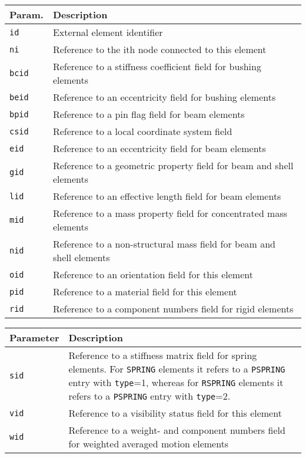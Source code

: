 \noindent
\begin{tabular}{| m{} | m{} |}
  \hline
  \rowcolor[HTML]{EFEFEF}
  Param. & Description  \\
  \hline\hline
  {\tt id} & External element identifier \\
  \hline
  {\tt ni} & Reference to the ith node connected to this element \\
  \hline
  {\tt bcid} & Reference to a stiffness coefficient field for bushing elements \\
  \hline
  {\tt beid} & Reference to an eccentricity field for bushing elements \\
  \hline
  {\tt bpid} & Reference to a pin flag field for beam elements \\
  \hline
  {\tt csid} & Reference to a local coordinate system field \\
  \hline
  {\tt eid} & Reference to an eccentricity field for beam elements \\
  \hline
  {\tt gid} & Reference to a geometric property field for beam and shell elements \\
  \hline
  {\tt lid} & Reference to an effective length field for beam elements \\
  \hline
  {\tt mid} & Reference to a mass property field for concentrated mass elements \\
  \hline
  {\tt nid} & Reference to a non-structural mass field for beam and shell elements \\
  \hline
  {\tt oid} & Reference to an orientation field for this element \\
  \hline
  {\tt pid} & Reference to a material field for this element \\
  \hline
  {\tt rid} & Reference to a component numbers field for rigid elements \\
  \hline
\end{tabular}

\noindent
\begin{tabular}{| m{} | m{} |}
  \hline
  \rowcolor[HTML]{EFEFEF}
  Parameter & Description  \\
  \hline\hline
  {\tt sid} & Reference to a stiffness matrix field for spring elements.\newline
              For {\tt SPRING} elements it refers to a {\tt PSPRING}
              entry with {\tt type}=1,
              whereas for {\tt RSPRING} elements it refers to a {\tt PSPRING}
              entry with {\tt type}=2. \\
  \hline
  {\tt vid} & Reference to a visibility status field for this element \\
  \hline
  {\tt wid} & Reference to a weight- and component numbers field for
              weighted averaged motion elements \\
  \hline
\end{tabular}


